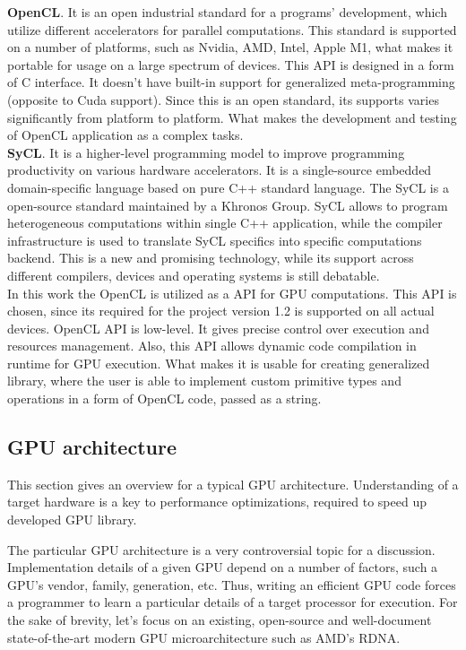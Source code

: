 \textbf{OpenCL}. It is an open industrial standard for a programs' development, which utilize different accelerators for parallel computations. This standard is supported on a number of platforms, such as Nvidia, AMD, Intel, Apple M1, what makes it portable for usage on a large spectrum of devices. This API is designed in a form of C interface. It doesn't have built-in support for generalized meta-programming (opposite to Cuda support). Since this is an open standard, its supports varies significantly from platform to platform. What makes the development and testing of OpenCL application as a complex tasks.\\

\textbf{SyCL}. It is a higher-level programming model to improve programming productivity on various hardware accelerators. It is a single-source embedded domain-specific language based on pure C++ standard language. The SyCL is a open-source standard maintained by a Khronos Group. SyCL allows to program heterogeneous computations within single C++ application, while the compiler infrastructure is used to translate SyCL specifics into specific computations backend. This is a new and promising technology, while its support across different compilers, devices and operating systems is still debatable.\\

In this work the OpenCL is utilized as a API for GPU computations. This API is chosen, since its required for the project version 1.2 is supported on all actual devices. OpenCL API is low-level. It gives precise control over execution and resources management. Also, this API allows dynamic code compilation in runtime for GPU execution. What makes it is usable for creating generalized library, where the user is able to implement custom primitive types and operations in a form of OpenCL code, passed as a string.

\subsection{GPU architecture}

This section gives an overview for a typical GPU architecture. Understanding of a target hardware is a key to performance optimizations, required to speed up developed GPU library.

The particular GPU architecture is a very controversial topic for a discussion. Implementation details of a given GPU depend on a number of factors, such a GPU's vendor, family, generation, etc. Thus, writing an efficient GPU code forces a programmer to learn a particular details of a target processor for execution. For the sake of brevity, let's focus on an existing, open-source and well-document state-of-the-art modern GPU microarchitecture such as AMD's RDNA.


